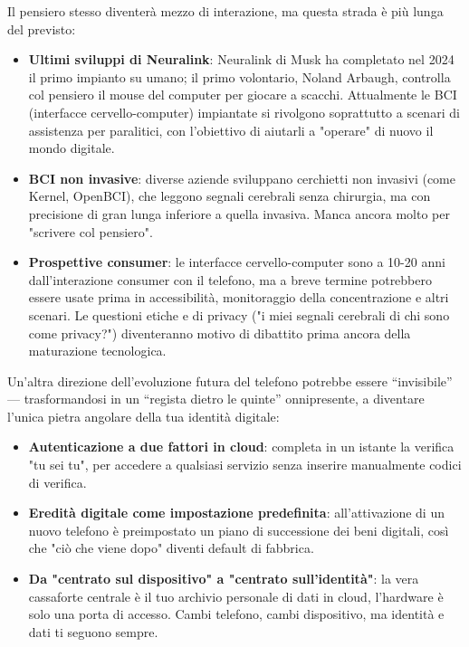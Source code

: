 Il pensiero stesso diventerà mezzo di interazione, ma questa strada è più lunga del previsto:

\begin{itemize}
  \item \textbf{Ultimi sviluppi di Neuralink}: Neuralink di Musk ha completato nel 2024 il primo impianto su umano; il primo volontario, Noland Arbaugh, controlla col pensiero il mouse del computer per giocare a scacchi. Attualmente le BCI (interfacce cervello-computer) impiantate si rivolgono soprattutto a scenari di assistenza per paralitici, con l'obiettivo di aiutarli a "operare" di nuovo il mondo digitale.
  \item \textbf{BCI non invasive}: diverse aziende sviluppano cerchietti non invasivi (come Kernel, OpenBCI), che leggono segnali cerebrali senza chirurgia, ma con precisione di gran lunga inferiore a quella invasiva. Manca ancora molto per "scrivere col pensiero".
  \item \textbf{Prospettive consumer}: le interfacce cervello-computer sono a 10-20 anni dall'interazione consumer con il telefono, ma a breve termine potrebbero essere usate prima in accessibilità, monitoraggio della concentrazione e altri scenari. Le questioni etiche e di privacy ("i miei segnali cerebrali di chi sono come privacy?") diventeranno motivo di dibattito prima ancora della maturazione tecnologica.
\end{itemize}


Un'altra direzione dell'evoluzione futura del telefono potrebbe essere “invisibile” — trasformandosi in un “regista dietro le quinte” onnipresente, a diventare l'unica pietra angolare della tua identità digitale:

\begin{itemize}
  \item \textbf{Autenticazione a due fattori in cloud}: completa in un istante la verifica "tu sei tu", per accedere a qualsiasi servizio senza inserire manualmente codici di verifica.
  \item \textbf{Eredità digitale come impostazione predefinita}: all'attivazione di un nuovo telefono è preimpostato un piano di successione dei beni digitali, così che "ciò che viene dopo" diventi default di fabbrica.
  \item \textbf{Da "centrato sul dispositivo" a "centrato sull'identità"}: la vera cassaforte centrale è il tuo archivio personale di dati in cloud, l'hardware è solo una porta di accesso. Cambi telefono, cambi dispositivo, ma identità e dati ti seguono sempre.
\end{itemize}

